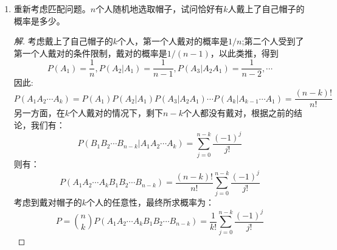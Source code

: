 \documentclass[12pt]{article}
\newcommand{\hei}{\CJKfamily{hei}}                          %
\begin{document}
\begin{enumerate}
\item {\hei 重新考虑匹配问题。$n$个人随机地选取帽子，试问恰好有$k$人戴上了自己帽子的概率是多少。}
\begin{proof}[解]
	考虑戴上了自己帽子的$k$个人，第一个人戴对的概率是$1/n$;第二个人受到了第一个人戴对的条件限制，戴对的概率是$1/(n−1)$，以此类推，得到
	\begin{equation}
	P(A_1)=\frac{1}{n},P(A_2|A_1)=\frac{1}{n-1},P(A_3|A_2A_1)=\frac{1}{n-2},\cdots
	\end{equation}
	因此:
	\begin{equation}
	P(A_1A_2\cdots A_k)=P(A_1)P(A_2|A_1)P(A_3|A_2A_1)\cdots P(A_k|A_{k-1}\cdots A_1)=\frac{(n-k)!}{n!}
	\end{equation}
	另一方面，在$k$个人戴对的情况下，剩下$n-k$个人都没有戴对，根据之前的结论，我们有：
	\begin{equation}
	P(B_1B_2\cdots B_{n-k}|A_1A_2\cdots A_k)=\sum_{j=0}^{n-k}\frac{(-1)^{j}}{j!}
	\end{equation}
	则有：
	\begin{equation}
	P(A_1A_2\cdots A_kB_1B_2\cdots B_{n-k})=\frac{(n-k)!}{n!}\sum_{j=0}^{n-k}\frac{(-1)^{j}}{j!}
	\end{equation}
	考虑到戴对帽子的$k$个人的任意性，最终所求概率为：
	\begin{equation}
	P=\binom{n}{k}P(A_1A_2\cdots A_kB_1B_2\cdots B_{n-k})=\frac{1}{k!}\sum_{j=0}^{n-k}\frac{(-1)^{j}}{j!}
	\end{equation}
\end{proof}


\end{enumerate}
\end{document}
